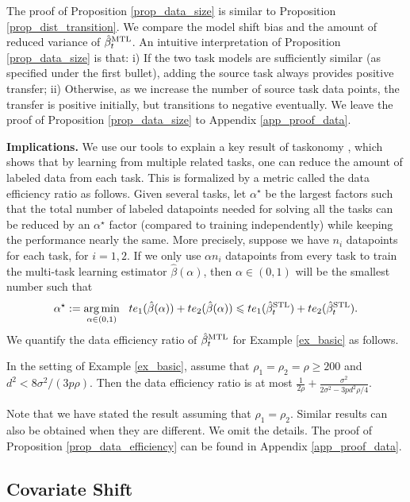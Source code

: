 The proof of Proposition \ref{prop_data_size} is similar to Proposition \ref{prop_dist_transition}.
We compare the model shift bias and the amount of reduced variance of $\hat{\beta}_t^{\text{MTL}}$.
An intuitive interpretation of Proposition \ref{prop_data_size} is that:
i) If the two task models are sufficiently similar (as specified under the first bullet), adding the source task always provides positive transfer;
ii) Otherwise, as we increase the number of source task data points, the transfer is positive initially, but transitions to negative eventually.
We leave the proof of Proposition \ref{prop_data_size} to Appendix \ref{app_proof_data}.

\textbf{Implications.} We use our tools to explain a key result of taskonomy \cite{ZSSGM18}, which shows that by learning from multiple related tasks, one can reduce the amount of labeled data from each task.
This is formalized by a metric called the data efficiency ratio as follows.
Given several tasks, let $\alpha^{\star}$ be the largest factors such that the total number of labeled datapoints needed for solving all the tasks can be reduced by an $\alpha^{\star}$ factor (compared to training independently) while keeping the performance nearly the same.
More precisely, suppose we have $n_i$ datapoints for each task, for $i= 1, 2$.
If we only use $\alpha n_i$ datapoints from every task to train the multi-task learning estimator $\hat{\beta}(\alpha)$, then $\alpha \in (0, 1)$ will be the smallest number such that
\[ \alpha^{\star} :=\operatorname*{arg\,min}_{\alpha\in(0, 1)} ~~ te_1(\hat{\beta}(\alpha)) + te_2(\hat{\beta}(\alpha))\leqslant te_1(\hat{\beta}_t^{\text{STL}}) + te_2(\hat{\beta}_t^{\text{STL}}). \]
We quantify the data efficiency ratio of $\hat{\beta}_t^{\text{MTL}}$ for Example \ref{ex_basic} as follows.

\begin{proposition}\label{prop_data_efficiency}
	In the setting of Example \ref{ex_basic}, assume that $\rho_1 = \rho_2 = \rho \ge 200$ and $d^2 < {8\sigma^2} /{(3p \rho)}$.
	Then the data efficiency ratio is at most $\frac{1}{2\rho} + \frac{\sigma^2}{2\sigma^2 - 3p d^2 \rho / 4}$.
\end{proposition}
Note that we have stated the result assuming that $\rho_1 = \rho_2$.
Similar results can also be obtained when they are different.
We omit the details.
The proof of Proposition \ref{prop_data_efficiency} can be found in Appendix \ref{app_proof_data}.




\subsection{Covariate Shift}\label{sec_covariate}


